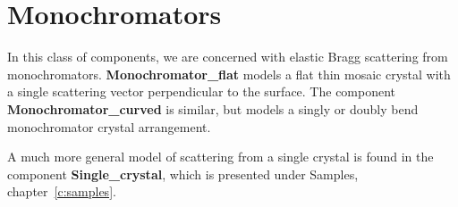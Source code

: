 
\chapter{Monochromators}

In this class of components, we are concerned with elastic Bragg
scattering from monochromators. {\bf Monochromator\_flat} 
models a flat thin mosaic crystal with a single scattering vector
perpendicular to the surface.  
The component {\bf Monochromator\_curved} is similar, 
but models a singly or doubly bend monochromator crystal arrangement.

A much more general model of scattering from a single crystal is 
found in the component {\bf Single\_crystal},
which is presented under Samples, chapter~\ref{c:samples}.


\newpage


